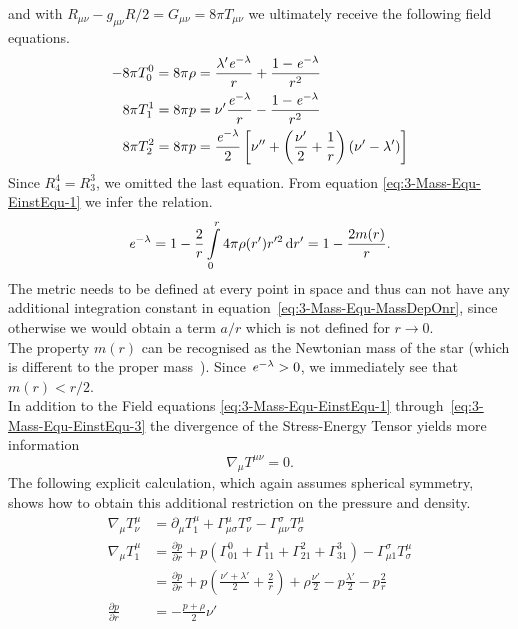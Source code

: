 and with $R_{\mu\nu}-g_{\mu\nu}R/2=G_{\mu\nu}=8\pi T_{\mu\nu}$ we ultimately receive the following field equations.
\begin{align}
	-8\pi T_0^0 = 8\pi\rho &= \frac{\lambda'\mathit{e}^{-\lambda}}{r}+\frac{1-\mathit{e}^{-\lambda}}{r^2}\label{eq:3-Mass-Equ-EinstEqu-1}\\
	8\pi T_1^1 = 8\pi p &= \nu'\frac{\mathit{e}^{-\lambda}}{r} - \frac{1-\mathit{e}^{-\lambda}}{r^2}\label{eq:3-Mass-Equ-EinstEqu-2}\\
	8\pi T_2^2 = 8\pi p &= \frac{\mathit{e}^{-\lambda}}{2}\left[\nu''+\left(\frac{\nu'}{2} + \frac{1}{r}\right)\left(\nu'-\lambda'\right) \right]\label{eq:3-Mass-Equ-EinstEqu-3}
\end{align}
Since $R_4^4=R_3^3$, we omitted the last equation.
From equation \eqref{eq:3-Mass-Equ-EinstEqu-1} we infer the relation.
\begin{equation}
	\mathit{e}^{-\lambda} = 1 - \frac{2}{r}\int\limits_0^r 4\pi\rho(r') r'^2\mathop{}\!\mathrm{d} r' = 1 - \frac{2m(r)}{r}.
	\label{eq:3-Mass-Equ-MassDepOnr}
\end{equation}
The metric needs to be defined at every point in space and thus can not have any additional integration constant in equation~\eqref{eq:3-Mass-Equ-MassDepOnr}, since otherwise we would obtain a term $a/r$ which is not defined for $r\rightarrow0$.\\
The property $m(r)$ can be recognised as the Newtonian mass of the star (which is different to the proper mass~\cite{waldGeneralRelativity1984}).
Since $\mathit{e}^{-\lambda}>0$, we immediately see that $m(r)<r/2$.\\
In addition to the Field equations \eqref{eq:3-Mass-Equ-EinstEqu-1} through~\eqref{eq:3-Mass-Equ-EinstEqu-3} the divergence of the Stress-Energy Tensor yields more information
\begin{equation}
	\nabla_\mu T^{\mu\nu}=0.
\end{equation}
The following explicit calculation, which again assumes spherical symmetry, shows how to obtain this additional restriction on the pressure and density.
\begin{align}
	\nabla_\mu T^\mu_\nu 	&= \partial_\mu T^\mu_1 + \Gamma^\mu_{\mu\sigma}T^\sigma_\nu-\Gamma^\sigma_{\mu\nu}T^\mu_\sigma\\
	\nabla_\mu T^\mu_1		&= \frac{\partial p}{\partial r} + p\left(\Gamma^0_{01}+\Gamma^1_{11}+\Gamma^2_{21}+\Gamma^3_{31} \right) - \Gamma^\sigma_{\mu 1}T^\mu_\sigma\\
							&= \frac{\partial p}{\partial r} + p\left(\frac{\nu'+\lambda'}{2} + \frac{2}{r}\right) + \rho\frac{\nu'}{2} - p\frac{\lambda'}{2} - p\frac{2}{r}\\
	\frac{\partial p}{\partial r} &= -\frac{p+\rho}{2}\nu'
\end{align}
